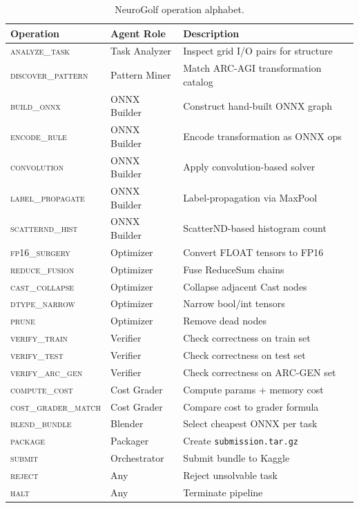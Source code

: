 \begin{table}[htbp]
\centering
\caption{NeuroGolf operation alphabet.}
\label{tab:exp6-alphabet}
\small
\begin{tabular}{lll}
\toprule
Operation & Agent Role & Description \\
\midrule
\textsc{analyze\_task}    & Task Analyzer   & Inspect grid I/O pairs for structure \\
\textsc{discover\_pattern}& Pattern Miner   & Match ARC-AGI transformation catalog \\
\textsc{build\_onnx}      & ONNX Builder    & Construct hand-built ONNX graph \\
\textsc{encode\_rule}     & ONNX Builder    & Encode transformation as ONNX ops \\
\textsc{convolution}       & ONNX Builder    & Apply convolution-based solver \\
\textsc{label\_propagate}  & ONNX Builder    & Label-propagation via MaxPool \\
\textsc{scatternd\_hist}   & ONNX Builder    & ScatterND-based histogram count \\
\textsc{fp16\_surgery}    & Optimizer       & Convert FLOAT tensors to FP16 \\
\textsc{reduce\_fusion}   & Optimizer       & Fuse ReduceSum chains \\
\textsc{cast\_collapse}   & Optimizer       & Collapse adjacent Cast nodes \\
\textsc{dtype\_narrow}    & Optimizer       & Narrow bool/int tensors \\
\textsc{prune}            & Optimizer       & Remove dead nodes \\
\textsc{verify\_train}    & Verifier        & Check correctness on train set \\
\textsc{verify\_test}     & Verifier        & Check correctness on test set \\
\textsc{verify\_arc\_gen} & Verifier        & Check correctness on ARC-GEN set \\
\textsc{compute\_cost}    & Cost Grader     & Compute params + memory cost \\
\textsc{cost\_grader\_match} & Cost Grader  & Compare cost to grader formula \\
\textsc{blend\_bundle}    & Blender         & Select cheapest ONNX per task \\
\textsc{package}          & Packager        & Create \texttt{submission.tar.gz} \\
\textsc{submit}           & Orchestrator    & Submit bundle to Kaggle \\
\textsc{reject}           & Any             & Reject unsolvable task \\
\textsc{halt}             & Any             & Terminate pipeline \\
\bottomrule
\end{tabular}
\end{table}


